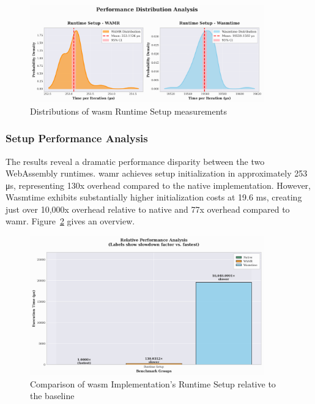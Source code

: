 \begin{figure}[htbp]
    \centering
    \includegraphics[width=0.9\textwidth]{images/wasm-setup-distribution}
    \caption{Distributions of \acrshort{wasm} Runtime Setup measurements}
    \label{fig:wasm-setup-distribution}
\end{figure}

\subsubsection{Setup Performance Analysis}
The results reveal a dramatic performance disparity between the two WebAssembly runtimes. \acrshort{wamr} achieves setup initialization in approximately 253 μs, representing 130x overhead compared to the native implementation. However, Wasmtime exhibits substantially higher initialization costs at 19.6 ms, creating just over 10,000x overhead relative to native and 77x overhead compared to \acrshort{wamr}. Figure~\ref{fig:wasm-setup-relative} gives an overview.

\begin{figure}[htbp]
    \centering
    \includegraphics[width=0.9\textwidth]{images/wasm-setup-relative}
    \caption{Comparison of \acrshort{wasm} Implementation's Runtime Setup relative to the baseline}
    \label{fig:wasm-setup-relative}
\end{figure}

